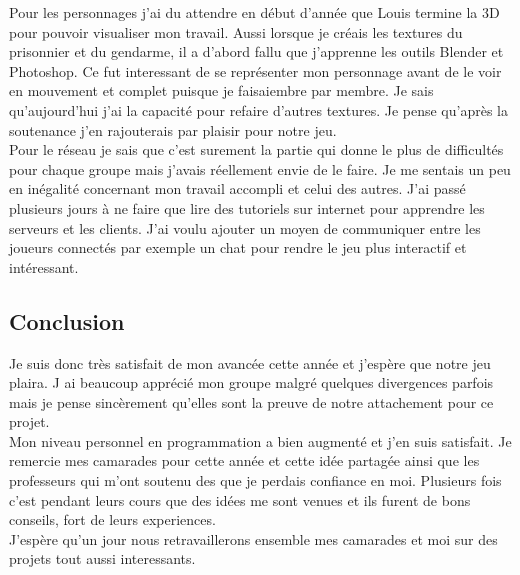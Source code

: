 \documentclass[12pt]{article}
\begin{document}
Pour les personnages j’ai du attendre en début d’année que Louis termine la 3D pour pouvoir visualiser mon travail. Aussi lorsque je créais les textures du prisonnier et du gendarme, il a d’abord fallu que j’apprenne  les outils Blender et Photoshop. Ce fut interessant de se représenter mon personnage avant de le voir en mouvement et complet puisque je faisaiembre par membre.  Je sais qu’aujourd’hui j’ai la capacité pour refaire d’autres textures. Je pense qu’après la soutenance j’en rajouterais par plaisir pour notre jeu.\\

Pour le réseau je sais que c’est surement la partie qui donne le plus de difficultés pour chaque groupe mais j’avais réellement envie de le faire. Je me sentais un peu en inégalité concernant mon travail accompli et celui des autres. J’ai passé plusieurs jours à ne faire que lire des tutoriels sur internet pour apprendre les serveurs et les clients. J’ai voulu ajouter un moyen de communiquer entre les joueurs connectés par exemple un chat pour rendre le jeu plus interactif et intéressant.\\

\newpage
\subsection{Conclusion}

Je suis donc très satisfait de mon avancée cette année et j'espère que notre jeu plaira. J ai beaucoup apprécié mon groupe malgré quelques divergences  parfois mais je pense sincèrement qu'elles sont la preuve de notre attachement pour ce projet.\\

Mon niveau personnel en programmation a bien augmenté et j'en suis satisfait. Je remercie mes camarades pour cette année et cette idée partagée ainsi que les professeurs qui m'ont soutenu des que je perdais confiance en moi. Plusieurs fois c'est pendant leurs cours que des idées me sont venues et ils furent de bons conseils, fort de leurs experiences.\\

 J'espère qu'un jour nous retravaillerons ensemble  mes camarades et moi sur des  projets tout aussi interessants.\\

\newpage
\thispagestyle{empty}
\pagestyle{fancyplain} \chead{} 
\listoffigures

\newpage
\setcounter{page}{1} 
\end{document}
